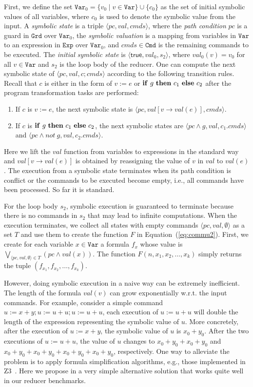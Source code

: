 \documentclass{llncs}
\newcommand{\Var}{\mathtt{Var}}
\newcommand{\Exp}{\mathtt{Exp}}
\newcommand{\Cmd}{\mathtt{Cmd}}
\newcommand{\Grd}{\mathtt{Grd}}
\newcommand{\true}{\mathsf{true}}
\newcommand{\ite}[3]{
	 \ifmmode
	 \mathbf{if}\ #1 \ \mathbf{then}\ #2\  \mathbf{else}\ #3
	 \else
	 \textbf{if}\ #1 \ \textbf{then}\ #2\  \textbf{else}\ #3
	 \fi}
\begin{document}
First, we define the set $\Var_0=\{v_0 \mid v \in \Var \}\cup \{c_0\}$ as the set of initial symbolic values of all variables, where $c_0$ is used to denote the symbolic value from the input.
A \emph{symbolic state} is a triple $\langle pc, val, cmds \rangle$, where the \emph{path condition} $pc$ is a guard in $\Grd$ over $\Var_0$, the \emph{symbolic valuation} is a mapping from variables in $\Var$ to an expression in $\Exp$ over $\Var_0$, and $cmds\in \Cmd$ is the remaining commands to be executed. The \emph{initial symbolic state} is $\langle \true, val_0, s_2\rangle$, where $val_0(v) = v_0$ for all $v\in\Var$ and $s_2$ is the loop body of the reducer. 
One can compute the next symbolic state of $\langle pc, val, c;cmds \rangle$ according to the following transition rules. Recall that $c$ is either in the form of $v:= e$ or $\ite{g}{c_1}{c_2}$ after the program transformation tasks are performed:
\begin{enumerate}
	\item If $c$ is $v:= e$, the next symbolic state is $\langle pc, val[v \rightarrow val(e) ], cmds \rangle$.
	\item If $c$ is $\ite{g}{c_1}{c_2}$, the next symbolic states are $\langle pc\wedge g, val, c_1.cmds \rangle$ and $\langle pc\wedge not\  g, val, c_2.cmds \rangle$. 
\end{enumerate}

Here we lift the $val$ function from variables to expressions in the standard way and $val[v \rightarrow val(e) ]$ is obtained by reassigning the value of $v$ in $val$ to $val(e)$. The execution from a symbolic state terminates when its path condition is conflict or the commands to be executed become empty, i.e., all commands have been processed. So far it is standard. 

For the loop body $s_2$, symbolic execution is guaranteed to terminate because there is no commands in $s_2$ that may lead to infinite computations.
When the execution terminates, we collect all states with empty commands $\langle pc, val, \emptyset \rangle$ as a set $T$ and use them to create the function $F$ in Equation~(\ref{eq:commu2}). 
First, we create for each variable $x\in\Var$ a formula $f_x$ whose value is $\bigvee_{\langle pc, val, \emptyset \rangle \in T} (pc \wedge val(x))$.
The function $F(n,x_1,x_2,\ldots,x_k)$ simply returns the tuple $(f_{x_1},f_{x_2},\ldots, f_{x_k})$.
 
However, doing symbolic execution in a naive way can be extremely inefficient. 
The length of the formula $val(v)$ can grow exponentially w.r.t. the input commands. For example, consider a simple command $u:=x+y;u:=u+u;u:=u+u$, each execution of $u:= u+ u$ will double the length of the expression representing the symbolic value of $u$. More concretely, after the execution of $u:=x+y$, the symbolic value of $u$ is $x_0+y_0$. After the two executions of $u:=u+u$, the value of $u$ changes to $x_0+y_0+x_0+y_0$ and $x_0+y_0+x_0+y_0+x_0+y_0+x_0+y_0$, respectively. One way to alleviate the problem is to apply formula simplification algorithms, e.g., those implemented in Z3~\cite{z3}. 
Here we propose in a very simple alternative solution that works quite well in our reducer benchmarks.
\end{document}
